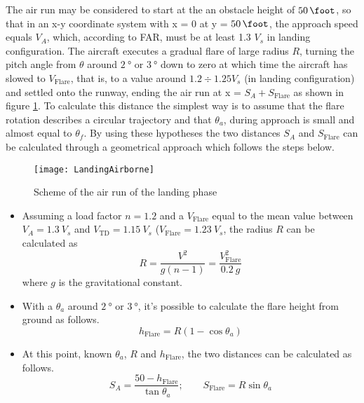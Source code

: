 \bigskip
\noindent
The air run may be considered to start at the an obstacle height of $\SI{50}{\foot}$, so that in an x-y coordinate system with x = 0 at y = $\SI{50}{\foot}$, the approach speed equals $V_A$, which, according to \gls{FAR}, must be at least 1.3 $V_s$ in landing configuration. The aircraft executes a gradual flare of large radius $R$, turning the pitch angle from $\theta$ around $\SI{2}{\degree}$ or $\SI{3}{\degree}$ down to zero at which time the aircraft has slowed to $V_{\text{Flare}}$, that is, to a value around $1.2\div1.25 V_s$ (in landing configuration) and settled onto the runway, ending the air run at x = $S_A+S_{\text{Flare}}$ as shown in figure \ref{fig:LANDairborne}. To calculate this distance the simplest way is to assume that the flare rotation describes a circular trajectory and that $\theta_a$, during approach is small and almost equal to $\theta_f$. By using these hypotheses the two distances $S_A$ and $S_{\text{Flare}}$ can be calculated through a geometrical approach which follows the steps below. 
%
\begin{figure}[!b]
\centering
\texttt{[image: LandingAirborne]}
\caption{Scheme of the air run of the landing phase}
\label{fig:LANDairborne}
\end{figure}
%
\begin{itemize}
%
\item Assuming a load factor $n=1.2$ and a $V_{\text{Flare}}$ equal to the mean value between $V_A=1.3\ V_s$ and $V_{\text{TD}}=1.15\ V_s$ ($V_{\text{Flare}}=1.23\ V_s$, the radius $R$ can be calculated as 
\begin{equation}
R=\dfrac{V^2}{g\left(n-1\right)}=\dfrac{V_{\text{Flare}}^2}{0.2\ g}
\label{eqn:Landing:Airborne:A}
\end{equation}
\noindent
where $g$ is the gravitational constant. 
%
\item With a $\theta_a$ around  $\SI{2}{\degree}$ or $\SI{3}{\degree}$, it's possible to calculate the flare height from ground as follows.
\begin{equation}
h_{\text{Flare}}=R\left(1-\cos\theta_a\right)
\label{eqn:Landing:Airborne:B}
\end{equation}
%
\item At this point, known $\theta_a$, $R$ and $h_{\text{Flare}}$, the two distances can be calculated as follows.
\begin{equation}
S_A=\dfrac{50-h_{\text{Flare}}}{\tan\theta_a}; \quad\quad S_{\text{Flare}}=R\sin\theta_a
\label{eqn:Landing:Airborne:C}
\end{equation}
%
\end{itemize}
%

